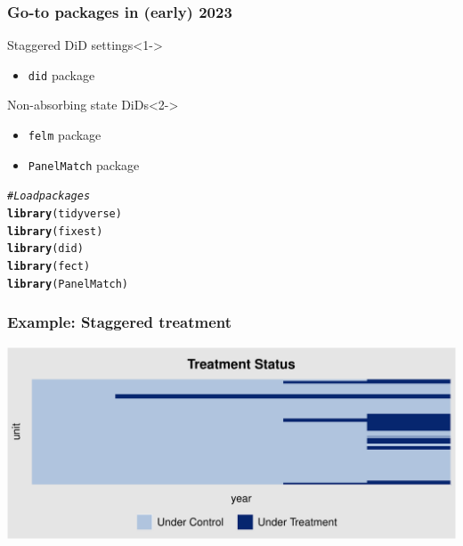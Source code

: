 \documentclass[12pt,aspectratio=169]{beamer}\usepackage[]{graphicx}\usepackage[]{xcolor}
\makeatletter
\def\maxwidth{ %
  \ifdim\Gin@nat@width>\linewidth
    \linewidth
  \else
    \Gin@nat@width
  \fi
}
\newcommand{\hlcom}[1]{\textcolor[rgb]{0.678,0.584,0.686}{\textit{#1}}}%
\newcommand{\hlstd}[1]{\textcolor[rgb]{0.345,0.345,0.345}{#1}}%
\newcommand{\hlkwd}[1]{\textcolor[rgb]{0.737,0.353,0.396}{\textbf{#1}}}%
\newenvironment{kframe}{%
 \def\at@end@of@kframe{}%
 \ifinner\ifhmode%
  \def\at@end@of@kframe{\end{minipage}}%
  \begin{minipage}{\columnwidth}%
 \fi\fi%
 \def\FrameCommand##1{\hskip\@totalleftmargin \hskip-\fboxsep
 \colorbox{shadecolor}{##1}\hskip-\fboxsep
     \hskip-\linewidth \hskip-\@totalleftmargin \hskip\columnwidth}%
 \MakeFramed {\advance\hsize-\width
   \@totalleftmargin\z@ \linewidth\hsize
   \@setminipage}}%
 {\par\unskip\endMakeFramed%
 \at@end@of@kframe}
\newenvironment{knitrout}{}{} %
\makeatother
\begin{document}
\begin{frame}[fragile]
    \frametitle{Go-to packages in (early) 2023}


    \begin{alertblock}{Staggered DiD settings}<1->
    \small

    \begin{itemize}[itemsep=0em, topsep=0pt]
        \item \texttt{did} package
    \end{itemize}

    \end{alertblock}

    \begin{alertblock}{Non-absorbing state DiDs}<2->
    \small

    \begin{itemize}[itemsep=0em, topsep=0pt]
        \item \texttt{felm} package
        \item \texttt{PanelMatch} package
    \end{itemize}

    \end{alertblock}
    \small

\begin{knitrout}
\color{fgcolor}\begin{kframe}
\begin{alltt}
\hlcom{# Load packages}
\hlkwd{library}\hlstd{(tidyverse)}
\hlkwd{library}\hlstd{(fixest)}
\hlkwd{library}\hlstd{(did)}
\hlkwd{library}\hlstd{(fect)}
\hlkwd{library}\hlstd{(PanelMatch)}
\end{alltt}
\end{kframe}
\end{knitrout}

\end{frame}


\begin{frame}[fragile]
    \frametitle{Example: Staggered treatment}
    \scriptsize
\begin{knitrout}
\color{fgcolor}

{\centering \includegraphics[width=\maxwidth]{figure/unnamed-chunk-3-1} 

}


\end{knitrout}

\end{frame}
\end{document}
